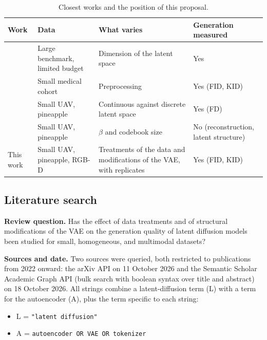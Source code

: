 \begin{table}[H]
\centering
\small
\begin{tabular}{p{}p{}p{}p{}}
\hline
\textbf{Work} & \textbf{Data} & \textbf{What varies} & \textbf{Generation measured} \\
\hline
\cite{Sehwag2025} & Large benchmark, limited budget & Dimension of the latent space & Yes \\
\cite{Fallah2026} & Small medical cohort & Preprocessing & Yes (FID, KID) \\
\cite{Gonzalez2026} & Small UAV, pineapple & Continuous against discrete latent space & Yes (FD) \\
\cite{XieLi2025VAE} & Small UAV, pineapple & $\beta$ and codebook size & No (reconstruction, latent structure) \\
This work & Small UAV, pineapple, RGB-D & Treatments of the data and modifications of the VAE, with replicates & Yes (FID, KID) \\
\hline
\end{tabular}
\caption{Closest works and the position of this proposal.}
\label{tab:position}
\end{table}

\subsection{Literature search}\label{sec:litsearch}

\textbf{Review question.} Has the effect of data treatments and of structural modifications of the VAE on the generation quality of latent diffusion models been studied for small, homogeneous, and multimodal datasets?

\textbf{Sources and date.} Two sources were queried, both restricted to publications from 2022 onward: the arXiv API on 11 October 2026 and the Semantic Scholar Academic Graph API (bulk search with boolean syntax over title and abstract) on 18 October 2026. All strings combine a latent-diffusion term (L) with a term for the autoencoder (A), plus the term specific to each string:
\begin{itemize}
  \item L = \texttt{"latent diffusion"}
  \item A = \texttt{autoencoder OR VAE OR tokenizer}
\end{itemize}

